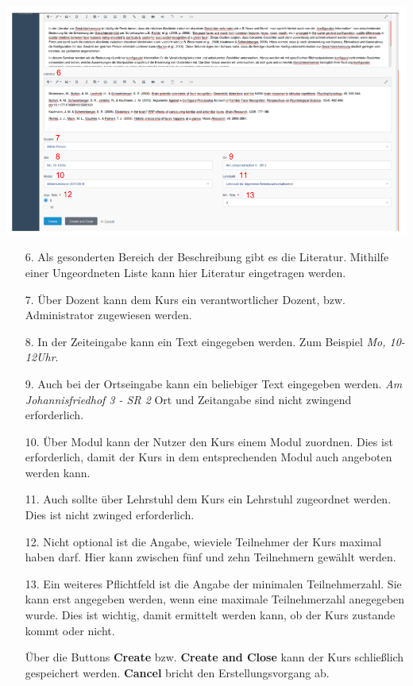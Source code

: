     \includegraphics[scale=0.3]{backend/img/create_course_2.png}
    \begin{enumerate}
     \item[6.] Als gesonderten Bereich der Beschreibung gibt es die Literatur. Mithilfe einer Ungeordneten Liste kann hier Literatur eingetragen werden.
     \item[7.] Über Dozent kann dem Kurs ein verantwortlicher Dozent, bzw. Administrator zugewiesen werden.
     \item[8.] In der Zeiteingabe kann ein Text eingegeben werden. Zum Beispiel \textit{Mo, 10-12Uhr}. 
     \item[9.] Auch bei der Ortseingabe kann ein beliebiger Text eingegeben werden. \textit{Am Johannisfriedhof 3 - SR 2}
	       Ort und Zeitangabe sind nicht zwingend erforderlich.
     \item[10.]Über Modul kann der Nutzer den Kurs einem Modul zuordnen. Dies ist erforderlich, damit der Kurs in dem entsprechenden Modul auch angeboten werden kann.
     \item[11.]Auch sollte über Lehrstuhl dem Kurs ein Lehrstuhl zugeordnet werden. Dies ist nicht zwinged erforderlich.
     \item[12.]Nicht optional ist die Angabe, wieviele Teilnehmer der Kurs maximal haben darf. Hier kann zwischen fünf und zehn Teilnehmern gewählt werden.
     \item[13.]Ein weiteres Pflichtfeld ist die Angabe der minimalen Teilnehmerzahl. Sie kann erst angegeben werden, wenn eine maximale Teilnehmerzahl anegegeben wurde.
	       Dies ist wichtig, damit ermittelt werden kann, ob der Kurs zustande kommt oder nicht.
     \item[]Über die Buttons \textbf{Create} bzw. \textbf{Create and Close} kann der Kurs schließlich gespeichert werden. \textbf{Cancel} bricht den Erstellungsvorgang ab.
    \end{enumerate}

